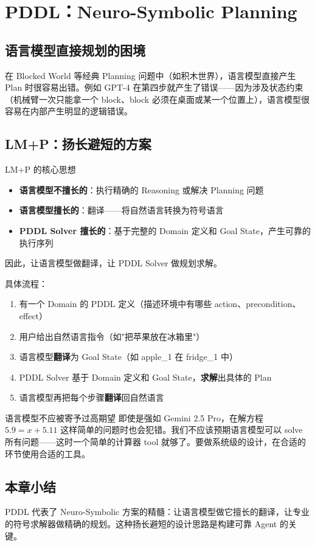 \section{PDDL：Neuro-Symbolic Planning}

\subsection{语言模型直接规划的困境}

在 Blocked World 等经典 Planning 问题中（如积木世界），语言模型直接产生 Plan 时很容易出错。例如 GPT-4 在第四步就产生了错误——因为涉及状态约束（机械臂一次只能拿一个 block、block 必须在桌面或某一个位置上），语言模型很容易在内部产生明显的逻辑错误。

\subsection{LM+P：扬长避短的方案}

\begin{importantbox}{LM+P 的核心思想}
\begin{itemize}
    \item \textbf{语言模型不擅长的}：执行精确的 Reasoning 或解决 Planning 问题
    \item \textbf{语言模型擅长的}：翻译——将自然语言转换为符号语言
    \item \textbf{PDDL Solver 擅长的}：基于完整的 Domain 定义和 Goal State，产生可靠的执行序列
\end{itemize}
因此，让语言模型做翻译，让 PDDL Solver 做规划求解。
\end{importantbox}

具体流程：
\begin{enumerate}
    \item 有一个 Domain 的 PDDL 定义（描述环境中有哪些 action、precondition、effect）
    \item 用户给出自然语言指令（如"把苹果放在冰箱里"）
    \item 语言模型\textbf{翻译}为 Goal State（如 apple\_1 在 fridge\_1 中）
    \item PDDL Solver 基于 Domain 定义和 Goal State，\textbf{求解}出具体的 Plan
    \item 语言模型再把每个步骤\textbf{翻译}回自然语言
\end{enumerate}

\begin{warningbox}{语言模型不应被寄予过高期望}
即使是强如 Gemini 2.5 Pro，在解方程 $5.9 = x + 5.11$ 这样简单的问题时也会犯错。我们不应该预期语言模型可以 solve 所有问题——这时一个简单的计算器 tool 就够了。要做系统级的设计，在合适的环节使用合适的工具。
\end{warningbox}

\subsection{本章小结}

PDDL 代表了 Neuro-Symbolic 方案的精髓：让语言模型做它擅长的翻译，让专业的符号求解器做精确的规划。这种扬长避短的设计思路是构建可靠 Agent 的关键。


